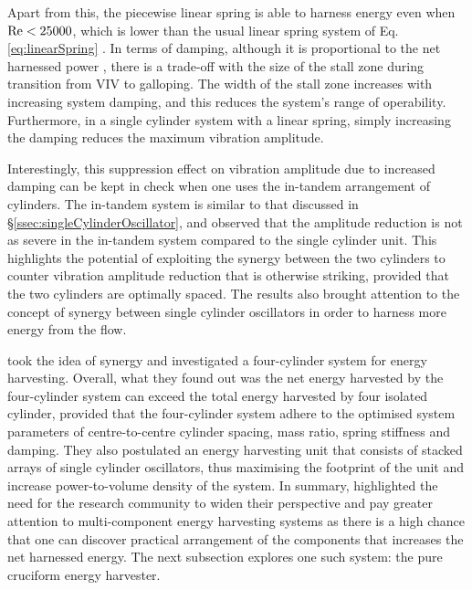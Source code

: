 \documentclass[oneside]{utmthesis}
\begin{document}
Apart from this, the piecewise linear spring is able to harness energy even when $\text{Re} < 25000$, which is lower than the usual linear spring system of Eq. \ref{eq:linearSpring} \citep{Sun2016}. In terms of damping, although it is proportional to the net harnessed power \citep{Ma2018}, there is a trade-off with the size of the stall zone during transition from VIV to galloping. The width of the stall zone increases with increasing system damping, and this reduces the system's range of operability. Furthermore, in a single cylinder system with a linear spring, simply increasing the damping reduces the maximum vibration amplitude.

Interestingly, this suppression effect on vibration amplitude due to increased damping can be kept in check when one uses the in-tandem arrangement of cylinders. The in-tandem system is similar to that discussed in \S\ref{ssec:singleCylinderOscillator}, and \citet{Sun2019b} observed that the amplitude reduction is not as severe in the in-tandem system compared to the single cylinder unit. This highlights the potential of exploiting the synergy between the two cylinders to counter vibration amplitude reduction that is otherwise striking, provided that the two cylinders are optimally spaced. The results also brought attention to the concept of synergy between single cylinder oscillators in order to harness more energy from the flow.

\citet{Kim2016} took the idea of synergy and investigated a four-cylinder system for energy harvesting. Overall, what they found out was the net energy harvested by the four-cylinder system can exceed the total energy harvested by four isolated cylinder, provided that the four-cylinder system adhere to the optimised system parameters of centre-to-centre cylinder spacing, mass ratio, spring stiffness and damping. They also postulated an energy harvesting unit that consists of stacked arrays of single cylinder oscillators, thus maximising the footprint of the unit and increase power-to-volume density of the system. In summary, \citet{Kim2016} highlighted the need for the research community to widen their perspective and pay greater attention to multi-component energy harvesting systems as there is a high chance that one can discover practical arrangement of the components that increases the net harnessed energy. The next subsection explores one such system: the pure cruciform energy harvester.
\end{document}
